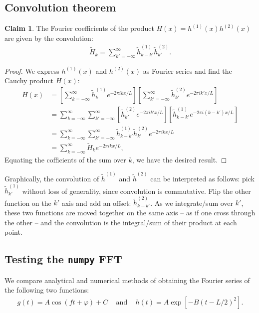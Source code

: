\documentclass{article}
\theoremstyle{definition}
\newtheorem*{claim}{Claim}
\renewcommand{\sp}[1]{\;\;\;\text{ #1 }\;\;\;}
\begin{document}
\subsection{Convolution theorem}

\begin{claim}
The Fourier coefficients of the product $H(x) = h^{(1)}(x) h^{(2)}(x)$
are given by the convolution:
\begin{align*}
\tilde H_k = \sum_{k' = -\infty}^\infty \tilde h^{(1)}_{k-k'}
\tilde h^{(2)}_{k'}.
\end{align*}
\end{claim}
\begin{proof}
We express $h^{(1)}(x)$
and $h^{(2)}(x)$ as Fourier series and find the Cauchy product $H(x)$:
\begin{align*}
H(x) &= 
\left[
\sum_{k = -\infty}^\infty \tilde h^{(1)}_{k} e^{-2\pi ikx/L}
\right]
\left[
\sum_{k' = -\infty}^\infty \tilde h^{(2)}_{k'} e^{-2\pi ik'x/L}
\right]
\\&=
\sum_{k = -\infty}^\infty \sum_{k' = -\infty}^\infty
\left[ \tilde h^{(2)}_{k'} e^{-2\pi ik' x/L} \right]
\left[ \tilde h^{(1)}_{k - k'} e^{-2\pi i(k - k') x/L} \right]
\\&=
\sum_{k = -\infty}^\infty \sum_{k' = -\infty}^\infty \tilde
h^{(1)}_{k - k'}
\tilde h^{(2)}_{k'} e^{-2\pi i k x/L}
\\&=
\sum_{k = -\infty}^\infty \tilde H_k e^{-2\pi i k x/L},
\end{align*}
Equating the cofficients of the sum over $k$, we have the desired
result.
\end{proof}

Graphically, the convolution of $\tilde h^{(1)}$ and $\tilde h^{(2)}$
can be interpreted as follows: pick $\tilde h^{(1)}_{k'}$ without loss of
generality, since convolution is commutative. Flip the other function
on the $k'$ axis and add an offset: $\tilde h^{(2)}_{k - k'}$. As we
integrate/sum over $k'$, these two functions are moved together on the same
axis -- as if one cross through the other -- 
and the convolution is the integral/sum of their product at each point.

\subsection{Testing the \texttt{numpy} FFT}

We compare analytical and numerical methods of obtaining the Fourier
series of the following two functions:
\begin{align*}
g(t) = A \cos (ft + \varphi) + C \sp{and}
h(t) = A \exp [-B (t - L/2)^2 ].
\end{align*}
\end{document}
